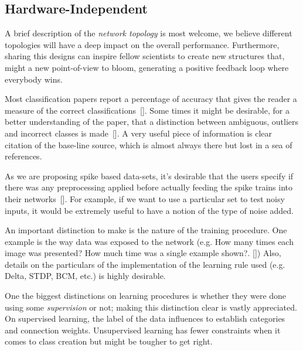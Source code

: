 \subsection{Hardware-Independent}
A brief description of the \emph{network topology} is most welcome, we believe different topologies will have a deep impact on the overall performance. Furthermore, sharing this designs can inspire fellow scientists to create new structures that, might  a new point-of-view to bloom, generating a positive feedback loop where everybody wins.

Most classification papers report a percentage of accuracy that gives the reader a measure of the correct classifications~[\cite{dietterich1998approximate}]. Some times it might be desirable, for a better understanding of the paper, that a distinction between ambiguous, outliers and incorrect classes is made~[\cite{liu2002performance}]. A very useful piece of information is clear citation of the base-line source, which is almost always there but lost in a sea of references.


As we are proposing spike based data-sets, it's desirable that the users specify if there was any preprocessing applied before actually feeding the spike trains into their networks~[\cite{best-practice-nn-img}]. For example, if we want to use a particular set to test noisy inputs, it would be extremely useful to have a notion of the type of noise added.


An important distinction to make is the nature of the training procedure. One example is the way data was exposed to the network (e.g. How many times each image was presented? How much time was a single example shown?. [\cite{Diehl2015unsupervised}]) Also, details on the particulars of the implementation of the learning rule used (e.g. Delta, STDP, BCM, etc.) is highly desirable. 

One the biggest distinctions on learning procedures is whether they were done using some \emph{supervision} or not; making this distinction clear is vastly appreciated. On supervised learning, the label of the data influences to establish categories and connection weights. Unsupervised learning has fewer constraints when it comes to class creation but might be tougher to get right. 

